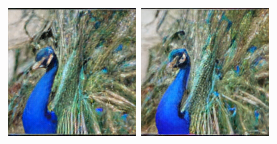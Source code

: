 \begin{figure}[h]
\begin{minipage}{0.15\textwidth}
    \end{minipage}
    \begin{minipage}{0.15\textwidth}
        \centering
        \includegraphics[width=\linewidth]{material/1k/66.png}
    \end{minipage}
    \begin{minipage}{0.15\textwidth}
        \centering
        \includegraphics[width=\linewidth]{material/8k/66.png}

\end{minipage}
\end{figure}
